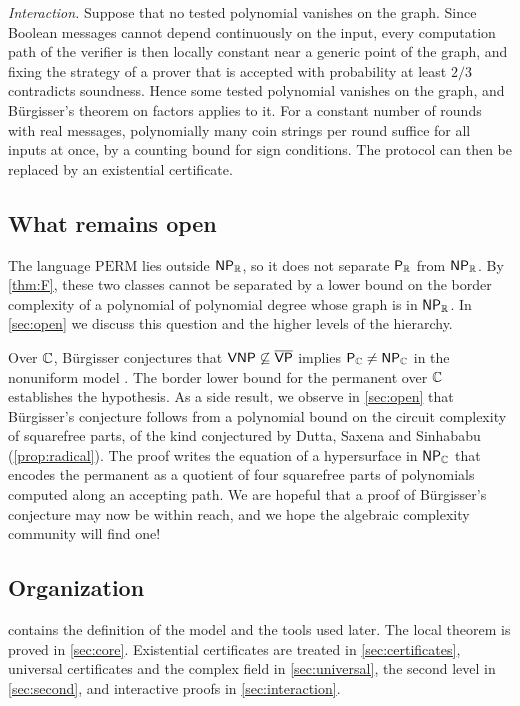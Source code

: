\emph{Interaction.} Suppose that no tested polynomial vanishes on the graph. Since Boolean messages cannot depend continuously on the input, every computation path of the verifier is then locally constant near a generic point of the graph, and fixing the strategy of a prover that is accepted with probability at least $2/3$ contradicts soundness. Hence some tested polynomial vanishes on the graph, and B\"urgisser's theorem on factors applies to it. For a constant number of rounds with real messages, polynomially many coin strings per round suffice for all inputs at once, by a counting bound for sign conditions. The protocol can then be replaced by an existential certificate.

\subsection{What remains open}

The language $\mathrm{PERM}$ lies outside $\textsf{\upshape NP}_{\mathbb{R}}$, so it does not separate $\textsf{\upshape P}_{\mathbb{R}}$ from $\textsf{\upshape NP}_{\mathbb{R}}$. By \cref{thm:F}, these two classes cannot be separated by a lower bound on the border complexity of a polynomial of polynomial degree whose graph is in $\textsf{\upshape NP}_{\mathbb{R}}$. In \cref{sec:open} we discuss this question and the higher levels of the hierarchy.

Over $\mathbb{C}$, B\"urgisser conjectures that $\textsf{\upshape VNP}\not\subseteq\overline{\textsf{\upshape VP}}$ implies $\textsf{\upshape P}_{\mathbb{C}}\ne\textsf{\upshape NP}_{\mathbb{C}}$ in the nonuniform model \cite[Conjecture~1.1]{Bur26}. The border lower bound for the permanent over $\mathbb{C}$ establishes the hypothesis. As a side result, we observe in \cref{sec:open} that B\"urgisser's conjecture follows from a polynomial bound on the circuit complexity of squarefree parts, of the kind conjectured by Dutta, Saxena and Sinhababu \cite{DSS22} (\cref{prop:radical}). The proof writes the equation of a hypersurface in $\textsf{\upshape NP}_{\mathbb{C}}$ that encodes the permanent as a quotient of four squarefree parts of polynomials computed along an accepting path. We are hopeful that a proof of B\"urgisser's conjecture may now be within reach, and we hope the algebraic complexity community will find one!

\subsection{Organization}

 contains the definition of the model and the tools used later. The local theorem is proved in \cref{sec:core}. Existential certificates are treated in \cref{sec:certificates}, universal certificates and the complex field in \cref{sec:universal}, the second level in \cref{sec:second}, and interactive proofs in \cref{sec:interaction}.

